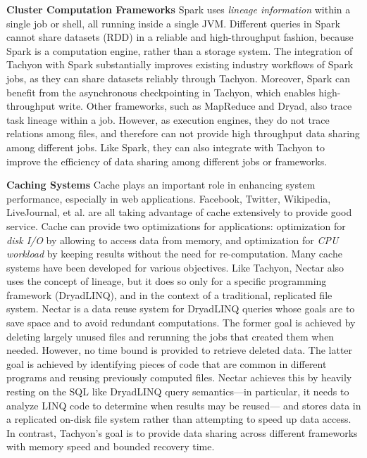 \documentclass[twocolumn]{article}
\begin{document}
\noindent
\textbf{Cluster Computation Frameworks} 
Spark uses \textit{lineage information} within a single job or shell, all running inside a single JVM. 
Different queries in Spark cannot share datasets (RDD) in a reliable and high-throughput fashion, 
because Spark is a computation engine, rather than a storage system. 
The integration of Tachyon with Spark substantially improves existing industry workflows of Spark jobs, 
as they can share datasets reliably through Tachyon. 
Moreover, Spark can benefit from the asynchronous checkpointing in Tachyon, which enables high-throughput write.
Other frameworks, such as MapReduce and Dryad, also trace task lineage within a job. 
However, as execution engines, they do not trace relations among files, 
and therefore can not provide high throughput data sharing among different jobs. 
Like Spark, they can also integrate with Tachyon to improve the efficiency of data sharing among different jobs or frameworks.

\noindent
\textbf{Caching Systems}
Cache plays an important role in enhancing system performance, especially in web applications. 
Facebook, Twitter, Wikipedia, LiveJournal, et al. are all taking advantage of cache extensively to provide good service. 
Cache can provide two optimizations for applications: optimization for \textit{disk I/O} by allowing to access data from
memory, and optimization for \textit{CPU workload} by keeping results without the need for re-computation. 
Many cache systems have been developed for various objectives.
Like Tachyon, Nectar also uses the concept of lineage, but it does so only for a specific programming framework (DryadLINQ), and in the context of a traditional, replicated file system. 
Nectar is a data reuse system for DryadLINQ queries whose goals are to save space and to avoid redundant computations. The former goal is achieved by deleting largely unused files and rerunning the jobs that created them when needed. However, no time bound is provided to retrieve deleted data. The latter goal is achieved by identifying pieces of code that are common in different programs and reusing previously computed files. Nectar achieves this by heavily resting on the SQL like DryadLINQ query semantics—in particular, it needs to analyze LINQ code to determine when results may be reused— and stores data in a replicated on-disk file system rather than attempting to speed up data access. In contrast, Tachyon’s goal is to provide data sharing across different frameworks with memory speed and bounded recovery time.
\end{document}
